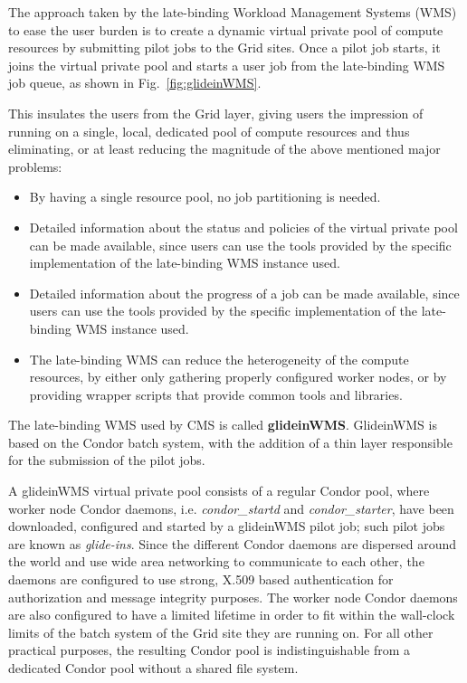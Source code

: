 \documentclass[a4paper]{jpconf}
\begin{document}
The approach taken by the late-binding Workload Management Systems (WMS) to ease the user burden is 
to create a dynamic virtual private pool of compute resources by submitting pilot jobs to the Grid sites.
Once a pilot job starts, it joins the virtual private pool and starts a user job from the late-binding WMS job queue, 
as shown in Fig.~\ref{fig:glideinWMS}.

This insulates the users from the Grid layer, giving users
the impression of running on a single, local, dedicated pool of compute resources
and thus eliminating, or at least reducing the magnitude of the above mentioned major problems:
\begin {itemize}
\item 
By having a single resource pool, no job partitioning is needed.
\item
Detailed information about the status and policies of the virtual private pool can be made available, 
since users can use the tools provided by the specific implementation of the late-binding WMS instance used.
\item 
Detailed information about the progress of a job can be made available,
since users can use the tools provided by the specific implementation of the late-binding WMS instance used.
\item
The late-binding WMS can reduce the heterogeneity of the compute resources, 
by either only gathering properly configured worker nodes,
or by providing wrapper scripts that provide common tools and libraries.
\end{itemize}

The late-binding WMS used by CMS is called \textbf{glideinWMS}. GlideinWMS is based on the Condor batch system, 
with the addition of a thin layer responsible for the submission of the pilot jobs.

A glideinWMS virtual private pool consists of a regular Condor pool, 
where worker node Condor daemons, i.e. \emph{condor\_startd} and \emph{condor\_starter}, 
have been downloaded, configured and started by a glideinWMS pilot job; such pilot jobs are known as \emph{glide-ins}. 
Since the different Condor daemons are dispersed around the world and use wide area networking to communicate to each other,
the daemons are configured to use strong, X.509 based authentication for authorization and message integrity purposes.
The worker node Condor daemons are also configured to have a limited lifetime in order to fit within the wall-clock limits 
of the batch system of the Grid site they are running on.
For all other practical purposes, the resulting Condor pool is indistinguishable from a dedicated Condor pool without a shared file system.
\end{document}
